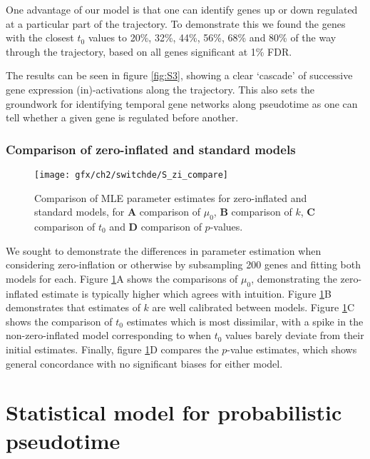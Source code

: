 One advantage of our model is that one can identify genes up or down regulated at a particular part of the trajectory. To demonstrate this we found the genes with the closest $t_0$ values to 20\%, 32\%, 44\%, 56\%, 68\% and 80\% of the way through the trajectory, based on all genes significant at 1\% FDR.

The results can be seen in figure \ref{fig:S3}, showing a clear `cascade' of successive gene expression (in)-activations along the trajectory. This also sets the groundwork for identifying temporal gene networks along pseudotime as one can tell whether a given gene is regulated before another.


\subsubsection{Comparison of zero-inflated and standard models}

\begin{figure}[!h]%
\centering
\texttt{[image: gfx/ch2/switchde/S\_zi\_compare]}
\caption[Comparison of MLE parameter estimates for zero-inflated and standard models.]{Comparison of MLE parameter estimates for zero-inflated and standard models, for \textbf{A} comparison of $\mu_0$, \textbf{B} comparison of $k$, \textbf{C} comparison of $t_0$ and \textbf{D} comparison of $p$-values.}\label{fig:S4}
\end{figure}


We sought to demonstrate the differences in parameter estimation when considering zero-inflation or otherwise by subsampling 200 genes and fitting both models for each. Figure \ref{fig:S4}A shows the comparisons of $\mu_0$, demonstrating the zero-inflated estimate is typically higher which agrees with intuition. Figure \ref{fig:S4}B demonstrates that estimates of $k$ are well calibrated between models. Figure \ref{fig:S4}C shows the comparison of $t_0$ estimates which is most dissimilar, with a spike in the non-zero-inflated model corresponding to when $t_0$ values barely deviate from their initial estimates. Finally, figure \ref{fig:S4}D compares the $p$-value estimates, which shows general concordance with no significant biases for either model.


\section{Statistical model for probabilistic pseudotime}


